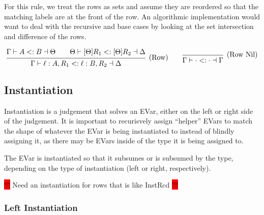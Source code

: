 \documentclass{article}
\newcommand{\consider}[1]{\colorbox{red}{!!!} #1 \colorbox{red}{!!!}}
\newcommand{\spc}{\qquad}
\newcommand{\lbl}{\ell}
\newcommand{\ev}{\hat}
\newcommand{\evar}[1][]{\ev \upalpha_{#1}}
\newcommand{\evaralt}{\ev \upbeta}
\newcommand{\ctxinout}[3]{#1 \vdash #2 \dashv #3}
\newcommand{\subsume}{<:}
\newcommand{\subsumes}[4]{\ctxinout {#1} {#2 \subsume #3} {#4}}
\newcommand{\instLSymbol}{\;\substack{<\\:=}\;}
\newcommand{\instRSymbol}{\;\substack{<\\=:}\;}
\newcommand{\apply}[1]{\left[#1\right]}
\newcommand{\instL}[4]{#1 \vdash #2 \instLSymbol #3 \dashv #4}
\newcommand{\instR}[4]{#1 \vdash #2 \instRSymbol #3 \dashv #4}
\newcommand{\deduct}[3][]
{
  \begin{prooftree}
    \hypo{#2}
    \infer1[\text{#1}]{#3}
  \end{prooftree}
}
\begin{document}
For this rule, we treat the rows as sets and assume they are reordered so that
the matching labels are at the front of the row. An algorithmic implementation
would want to deal with the recursive and base cases by looking at the set
intersection and difference of the rows.

\[
  \deduct[(Row)]
  {\subsumes{\Gamma}{A}{B}{\Theta}
    \spc
    \subsumes{\Theta}{[\Theta] R_1}{[\Theta] R_2}{\Delta}
  }
  { \subsumes{\Gamma}{\lbl : A, R_1}{\lbl : B, R_2}{\Delta} }
  \spc
  \deduct[(Row Nil)]{}{ \subsumes{\Gamma}{\cdot}{\cdot}{\Gamma} }
\]





\subsection{Instantiation}

Instantiation is a judgement that solves an EVar, either on the left or right
side of the judgement. It is important to recurisvely assign ``helper'' EVars to
match the shape of whatever the EVar is being instantiated to instead of blindly
assigning it, as there may be EVars inside of the type it is being assigned to.

The EVar is instantiated so that it subsumes or is subsumed by the type,
depending on the type of instantiation (left or right, respectively).

\consider{Need an instantiation for rows that is like InstRcd}

\subsubsection{Left Instantiation}
\end{document}
